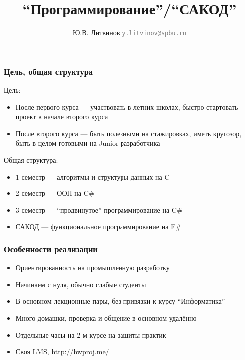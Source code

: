 \documentclass[xetex,mathserif,serif]{beamer}
\title{``Программирование''/``САКОД''}
\author[Юрий Литвинов]{Ю.В. Литвинов \newline 
    \textcolor{gray}{\small\texttt{y.litvinov@spbu.ru}}
}
\date{}
\begin{document}
    \begin{frame}
        \frametitle{Цель, общая структура}
        Цель:
        \begin{itemize}
            \item После первого курса --- участвовать в летних школах, быстро стартовать проект в начале второго курса
            \item После второго курса --- быть полезными на стажировках, иметь кругозор, быть в целом готовыми на Junior-разработчика
        \end{itemize}
        Общая структура:
        \begin{itemize}
            \item 1 семестр --- алгоритмы и структуры данных на C
            \item 2 семестр --- ООП на C\#
            \item 3 семестр --- ``продвинутое'' программирование на C\#
            \item САКОД --- функциональное программирование на F\#
        \end{itemize}
    \end{frame}

    \begin{frame}
        \frametitle{Особенности реализации}
        \begin{itemize}
            \item Ориентированность на промышленную разработку
            \item Начинаем с нуля, обычно слабые студенты
            \item В основном лекционные пары, без привязки к курсу ``Информатика''
            \item Много домашки, проверка и общение в основном удалённо
            \item Отдельные часы на 2-м курсе на защиты практик
            \item Своя LMS, \url{http://hwproj.me/}
        \end{itemize}
    \end{frame}
\end{document}
